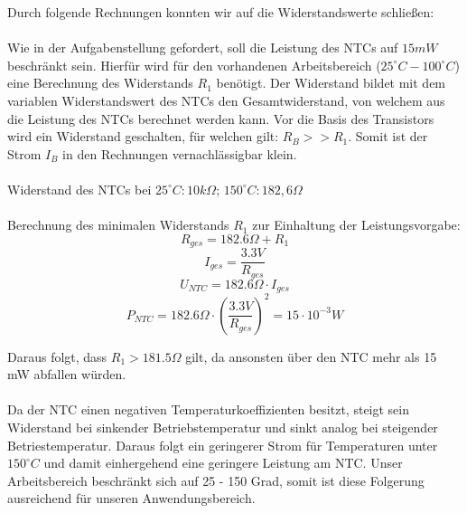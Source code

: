 \newpage
\noindent
Durch folgende Rechnungen konnten wir auf die Widerstandswerte schließen: \\
\\
Wie in der Aufgabenstellung gefordert, soll die Leistung des NTCs auf $15 mW$ beschränkt sein. Hierfür wird für den vorhandenen Arbeitsbereich ($25^{\circ} C - 100^{\circ} C$) eine Berechnung des Widerstands $R_1$ benötigt. Der Widerstand bildet mit dem variablen Widerstandswert des NTCs den Gesamtwiderstand, von welchem aus die Leistung des NTCs berechnet werden kann. Vor die Basis des Transistors wird ein Widerstand geschalten, für welchen gilt: $R_B >> R_1$. Somit ist der Strom $I_B$ in den Rechnungen vernachlässigbar klein.\\
\\
Widerstand des NTCs bei $25^{\circ} C: 10 k\Omega$; $150^{\circ} C: 182,6 \Omega$ \\
\\
Berechnung des minimalen Widerstands $R_1$ zur Einhaltung der Leistungsvorgabe:
\[ R_{ges} = 182.6 \Omega + R_1 \]
\[ I_{ges} = \frac{3.3 V}{R_{ges}} \]
\[ U_{NTC} = 182.6 \Omega \cdot I_{ges} \]
\[ P_{NTC} = 182.6 \Omega \cdot \left(\frac{3.3 V}{R_{ges}}\right)^2 = 15\cdot10^{-3} W \]


Daraus folgt, dass $R_1 > 181.5 \Omega$ gilt, da ansonsten über den NTC mehr als 15 mW abfallen würden. \\
\\
Da der NTC einen negativen Temperaturkoeffizienten besitzt, steigt sein Widerstand bei sinkender Betriebstemperatur und sinkt analog bei steigender Betriestemperatur. Daraus folgt ein geringerer Strom für Temperaturen unter $150^{\circ} C$ und damit einhergehend eine geringere Leistung am NTC. Unser Arbeitsbereich beschränkt sich auf 25 - 150 Grad, somit ist diese Folgerung ausreichend für unseren Anwendungsbereich. \\

